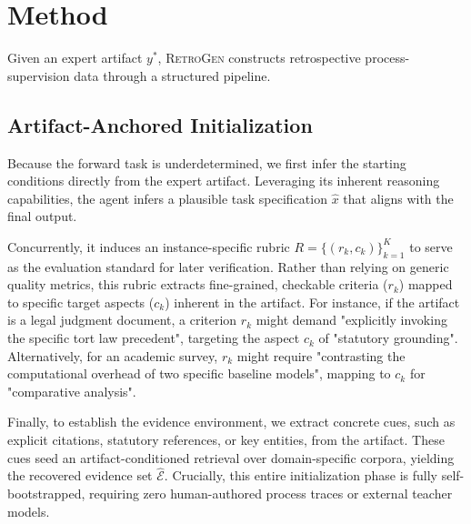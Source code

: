 \section{Method}
\label{sec:method}

Given an expert artifact $y^{*}$, \textsc{RetroGen} constructs retrospective process-supervision data through a structured pipeline. 

\subsection{Artifact-Anchored Initialization}
Because the forward task is underdetermined, we first infer the starting conditions directly from the expert artifact. Leveraging its inherent reasoning capabilities, the agent infers a plausible task specification $\hat{x}$ that aligns with the final output.

Concurrently, it induces an instance-specific rubric $R=\{(r_{k},c_{k})\}_{k=1}^{K}$ to serve as the evaluation standard for later verification. Rather than relying on generic quality metrics, this rubric extracts fine-grained, checkable criteria ($r_{k}$) mapped to specific target aspects ($c_{k}$) inherent in the artifact. For instance, if the artifact is a legal judgment document, a criterion $r_{k}$ might demand "explicitly invoking the specific tort law precedent", targeting the aspect $c_{k}$ of "statutory grounding". Alternatively, for an academic survey, $r_{k}$ might require "contrasting the computational overhead of two specific baseline models", mapping to $c_{k}$ for "comparative analysis". 

Finally, to establish the evidence environment, we extract concrete cues, such as explicit citations, statutory references, or key entities, from the artifact. These cues seed an artifact-conditioned retrieval over domain-specific corpora, yielding the recovered evidence set $\hat{\mathcal{E}}$. Crucially, this entire initialization phase is fully self-bootstrapped, requiring zero human-authored process traces or external teacher models.

